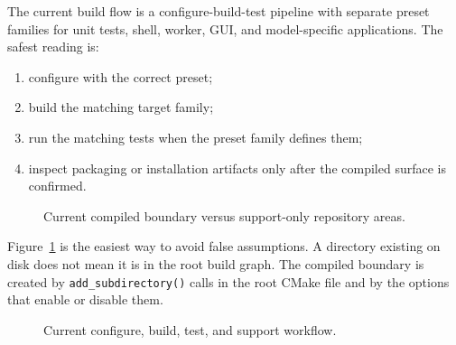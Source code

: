The current build flow is a configure-build-test pipeline with separate preset
families for unit tests, shell, worker, GUI, and model-specific applications.
The safest reading is:
\begin{enumerate}
\item configure with the correct preset;
\item build the matching target family;
\item run the matching tests when the preset family defines them;
\item inspect packaging or installation artifacts only after the compiled
surface is confirmed.
\end{enumerate}

\begin{figure}[htbp]
\centering
\caption{Current compiled boundary versus support-only repository areas.}
\label{fig:repo-boundary-map}
\end{figure}

Figure~\ref{fig:repo-boundary-map} is the easiest way to avoid false
assumptions. A directory existing on disk does not mean it is in the root build
graph. The compiled boundary is created by \texttt{add\_subdirectory()} calls in
the root CMake file and by the options that enable or disable them.

\begin{figure}[htbp]
\centering
\caption{Current configure, build, test, and support workflow.}
\label{fig:repo-build-flow}
\end{figure}

